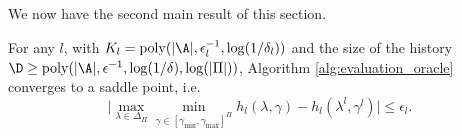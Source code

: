 \documentclass{article}
\newcommand{\1}{\mathbf{1}}
\begin{document}
We now have the second main result of this section.

\begin{theorem}\label{lem:SP}
For any $l$, with $K_l=\operatorname{poly}(|\A|,\epsilon_l^{-1},\log(1/\delta_l))$ and the size of the history $\D\geq\operatorname{poly}(|\A|,\epsilon^{-1},\log(1/\delta),\log(|\Pi|))$, Algorithm \ref{alg:evaluation_oracle} converges to a saddle point, i.e. 
\[\Big|\max _{\lambda\in \Delta_{\Pi}} \min _{\gamma\in [\gamma_{\min},\gamma_{\max}]^{\Pi}} h_l(\lambda,\gamma)-h_l(\lambda^{l},\gamma^l)\Big|\leq \epsilon_l.\]
\end{theorem}
\end{document}
